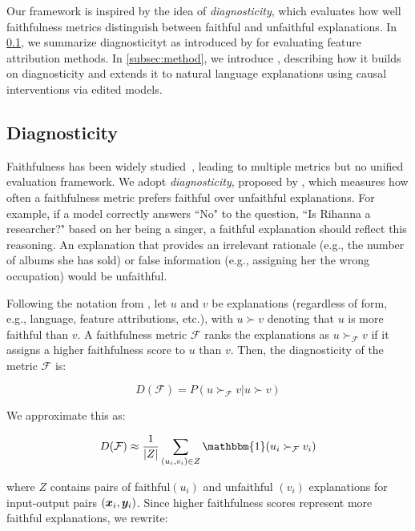 Our \methodname framework is inspired by the idea of \textit{diagnosticity}, which evaluates how well faithfulness metrics distinguish between faithful and unfaithful explanations. In \ref{subsec:diagnosticity}, we summarize diagnosticityt as introduced by \citet{Chan2022ACS} for evaluating feature attribution methods. In \ref{subsec:method}, we introduce \methodname, describing how it builds on diagnosticity and extends it to natural language explanations using causal interventions via edited models.

\subsection{Diagnosticity}
\label{subsec:diagnosticity}
Faithfulness has been widely studied~\citep{Jacovi2020TowardsFI}, leading to multiple metrics but no unified evaluation framework. We adopt \textit{diagnosticity}, proposed by \citet{Chan2022ACS}, which measures how often a faithfulness metric prefers faithful over unfaithful explanations. For example, if a model correctly answers ``No" to the question, ``Is Rihanna a researcher?" based on her being a singer, a faithful explanation should reflect this reasoning. An explanation that provides an irrelevant rationale (e.g., the number of albums she has sold) or false information (e.g., assigning her the wrong occupation) would be unfaithful.

Following the notation from \citet{Chan2022ACS}, let $u$ and $v$ be explanations (regardless of form, e.g., language, feature attributions, etc.), with $u \succ v$ denoting that $u$ is more faithful than $v$. A faithfulness metric $\mathcal{F}$ ranks the explanations as $u \succ_{\mathcal{F}} v$ if it assigns a higher faithfulness score to $u$ than $v$. Then, the diagnosticity of the metric $\mathcal{F}$ is:

\begin{equation}
D(\mathcal{F}) = P(u \succ_{\mathcal{F}} v | u \succ v)
\end{equation}

We approximate this as:

\begin{equation}
D(\mathcal{F}) \approx \frac{1}{|Z|} \sum_{(u_i, v_i) \in Z} 
\mathbbm{1} (u_i \succ_{\mathcal{F}} v_i) 
\end{equation}

where $Z$ contains pairs of faithful$(u_i)$ and unfaithful $(v_i)$ explanations for input-output pairs $({\bm{x}}_i, {\bm{y}}_i)$. Since higher faithfulness scores represent more faithful explanations,  we rewrite:

